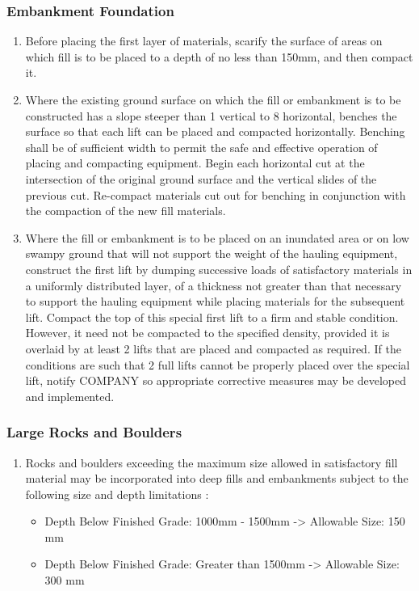 \documentclass{article}%
\begin{document}
\subsubsection{Embankment Foundation}%
\label{ssubsec:EmbankmentFoundation}%
\begin{enumerate}[label=\alph*),start=1]%
\item%
Before placing the first layer of materials, scarify the surface of areas on which fill is to be placed to a depth of no less than 150mm, and then compact it.%
\item%
Where the existing ground surface on which the fill or embankment is to be constructed has a slope steeper than 1 vertical to 8 horizontal, benches the surface so that each lift can be placed and compacted horizontally. Benching shall be of sufficient width to permit the safe and effective operation of placing and compacting equipment. Begin each horizontal cut at the intersection of the original ground surface and the vertical slides of the previous cut. Re{-}compact materials cut out for benching in conjunction with the compaction of the new fill materials.%
\item%
Where the fill or embankment is to be placed on an inundated area or on low swampy ground that will not support the weight of the hauling equipment, construct the first lift by dumping successive loads  of satisfactory materials in a uniformly distributed layer, of a thickness not greater than that necessary to support the hauling equipment while placing materials for the subsequent lift. Compact the top of this special first lift to a firm and stable condition.  However, it need not be compacted to the specified density, provided it is overlaid by at least 2 lifts that are placed and compacted as required. If the conditions are such that 2 full lifts cannot be properly placed over the special lift, notify COMPANY so appropriate corrective measures may be developed and implemented.%
\end{enumerate}

%
\subsubsection{Large Rocks and Boulders}%
\label{ssubsec:LargeRocksandBoulders}%
\begin{enumerate}[label=\alph*),start=1]%
\item%
Rocks and boulders exceeding the maximum size allowed in satisfactory fill material may be incorporated into deep fills and embankments subject to the following size and depth limitations :%
\begin{itemize}%
\item%
 Depth Below Finished Grade: 1000mm {-} 1500mm  {-}> Allowable Size: 150 mm%
\item%
 Depth Below Finished Grade: Greater than 1500mm  {-}> Allowable Size: 300 mm%
\end{itemize}%
\end{enumerate}
\end{document}
